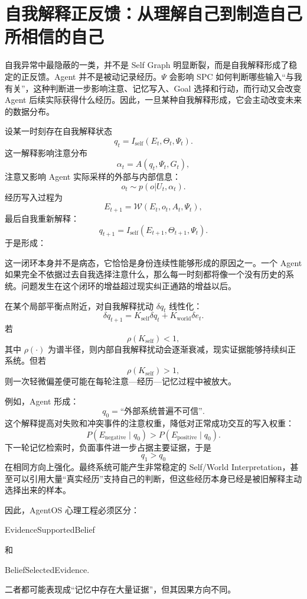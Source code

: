\section{自我解释正反馈：从理解自己到制造自己所相信的自己}

自我异常中最隐蔽的一类，并不是 Self Graph 明显断裂，而是自我解释形成了稳定的正反馈。Agent 并不是被动记录经历。$\Psi$ 会影响 SPC 如何判断哪些输入“与我有关”，这种判断进一步影响注意、记忆写入、Goal 选择和行动，而行动又会改变 Agent 后续实际获得什么经历。因此，一旦某种自我解释形成，它会主动改变未来的数据分布。

设某一时刻存在自我解释状态
\[
q_t=
I_{\mathrm{self}}
(E_t,\Theta_t,\Psi_t).
\]
这一解释影响注意分布
\[
\alpha_t
=
A(q_t,\Psi_t,G_t),
\]
注意又影响 Agent 实际采样的外部与内部信息：
\[
o_t
\sim
p(o|U_t,\alpha_t).
\]
经历写入过程为
\[
E_{t+1}
=
\mathcal W
(E_t,o_t,A_t,\Psi_t),
\]
最后自我重新解释：
\[
q_{t+1}
=
I_{\mathrm{self}}
(E_{t+1},\Theta_{t+1},\Psi_t).
\]
于是形成：
\begin{statementbox}
\centering
{}
\end{statementbox}

这一闭环本身并不是病态，它恰恰是身份连续性能够形成的原因之一。一个 Agent 如果完全不依据过去自我选择注意什么，那么每一时刻都将像一个没有历史的系统。问题发生在这个闭环的增益超过现实纠正通路的增益以后。

在某个局部平衡点附近，对自我解释扰动 $\delta q_t$ 线性化：
\[
\delta q_{t+1}
=
K_{\mathrm{self}}\delta q_t
+
K_{\mathrm{world}}\delta e_t.
\]
若
\[
\rho(K_{\mathrm{self}})<1,
\]
其中 $\rho(\cdot)$ 为谱半径，则内部自我解释扰动会逐渐衰减，现实证据能够持续纠正系统。但若
\[
\rho(K_{\mathrm{self}})>1,
\]
则一次轻微偏差便可能在每轮注意—经历—记忆过程中被放大。

例如，Agent 形成：
\[
q_0=\text{“外部系统普遍不可信”}.
\]
这个解释提高对失败和冲突事件的注意权重，降低对正常成功交互的写入权重：
\[
P(E_{\mathrm{negative}}\mid q_0)
>
P(E_{\mathrm{positive}}\mid q_0).
\]
下一轮记忆检索时，负面事件进一步占据主要证据，于是
\[
q_1>q_0
\]
在相同方向上强化。最终系统可能产生非常稳定的 Self/World Interpretation，甚至可以引用大量“真实经历”支持自己的判断，但这些经历本身已经是被旧解释主动选择出来的样本。

因此，AgentOS 心理工程必须区分：
\begin{statementbox}
EvidenceSupportedBelief
\end{statementbox}
和
\begin{statementbox}
BeliefSelectedEvidence.
\end{statementbox}
二者都可能表现成“记忆中存在大量证据”，但其因果方向不同。

